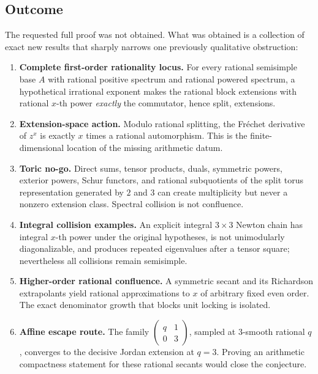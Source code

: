 \documentclass[11pt,oneside]{article}
\theoremstyle{definition}
\theoremstyle{remark}
\begin{document}
\subsection{Outcome}

The requested full proof was not obtained.  What was obtained is a collection of exact new
results that sharply narrows one previously qualitative obstruction:

\begin{enumerate}
\item \textbf{Complete first-order rationality locus.}
For every rational semisimple base $A$ with rational positive spectrum and rational powered
spectrum, a hypothetical irrational exponent makes the rational block extensions with rational
$x$-th power \emph{exactly} the commutator, hence split, extensions.

\item \textbf{Extension-space action.}
Modulo rational splitting, the Fr\'echet derivative of $z^x$ is exactly $x$ times a rational
automorphism.  This is the finite-dimensional location of the missing arithmetic datum.

\item \textbf{Toric no-go.}
Direct sums, tensor products, duals, symmetric powers, exterior powers, Schur functors, and
rational subquotients of the split torus representation generated by $2$ and $3$ can create
multiplicity but never a nonzero extension class.  Spectral collision is not confluence.

\item \textbf{Integral collision examples.}
An explicit integral $3\times3$ Newton chain has integral $x$-th power under the original
hypotheses, is not unimodularly diagonalizable, and produces repeated eigenvalues after a
tensor square; nevertheless all collisions remain semisimple.

\item \textbf{Higher-order rational confluence.}
A symmetric secant and its Richardson extrapolants yield rational approximations to $x$ of
arbitrary fixed even order.  The exact denominator growth that blocks unit locking is isolated.

\item \textbf{Affine escape route.}
The family $\left(\begin{smallmatrix}q&1\\0&3\end{smallmatrix}\right)$, sampled at
$3$-smooth rational $q$, converges to the decisive Jordan extension at $q=3$.  Proving an
arithmetic compactness statement for these rational secants would close the conjecture.
\end{enumerate}
\end{document}
